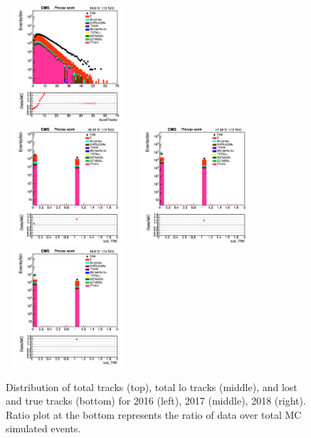\documentclass{cernatlasnote}
\begin{document}
\begin{figure}[htp]
 \includegraphics[width=4.6cm, height=4.4cm]{images/emu_channel/2018/18_Range_0pt2_1pt8/track_nLostTracks_TRK_Log.png}\\
\includegraphics[width=4.6cm, height=4.4cm]{images/emu_channel/2016/16_Range_0pt2_1pt8/track_lost_TRK_Log.png}
\includegraphics[width=4.6cm, height=4.4cm]{images/emu_channel/2017/17_Range_0pt2_1pt8/track_lost_TRK_Log.png}
 \includegraphics[width=4.6cm, height=4.4cm]{images/emu_channel/2018/18_Range_0pt2_1pt8/track_lost_TRK_Log.png}\\
  \caption{Distribution of total tracks (top), total lo tracks (middle), and lost and true tracks (bottom) for 2016 (left), 2017 (middle), 2018 (right). Ratio plot at the bottom represents the ratio of data over total MC simulated events.}
 \label{fig:L0DATAMC}
  \end{figure}
\end{document}
